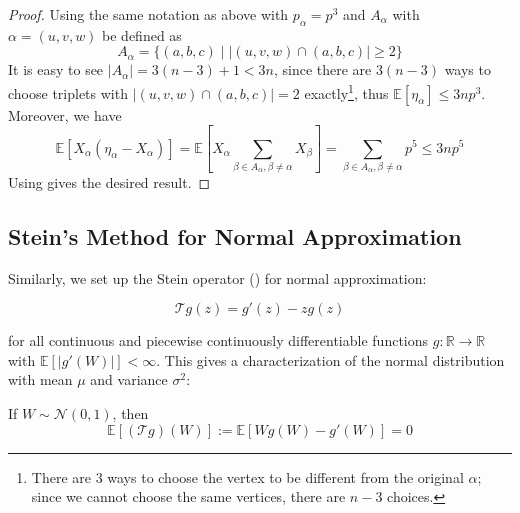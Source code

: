 \documentclass{article}
\begin{document}
\begin{proof}
    Using the same notation as above with $p_\alpha=p^3$ and $A_\alpha$ with $\alpha=(u,v,w)$ be defined as 
    \begin{equation*}
        A_{\alpha} = \{(a,b,c) \mid |(u,v,w)\cap (a,b,c)|\geq 2\}
    \end{equation*}
    It is easy to see $|A_\alpha| = 3(n-3) + 1 < 3n$, since there are  $3(n-3)$ ways to choose triplets with  $|(u,v,w)\cap (a,b,c)| = 2$ exactly\footnote{There are 3 ways to choose the vertex to be different from the original $\alpha$; since we cannot choose the same vertices, there are $n-3$ choices.}, thus $\mathbb{E}[\eta_\alpha]\leq 3np^3$. Moreover, we have  
    \begin{equation*}
        \mathbb{E}[X_\alpha(\eta_\alpha - X_\alpha)] = \mathbb{E}[X_\alpha \sum_{\beta \in A_\alpha, \beta \neq \alpha} X_\beta] = \sum_{\beta \in A_\alpha, \beta \neq \alpha} p^5 \leq 3np^5
    \end{equation*}
    Using  gives the desired result.
\end{proof}


\subsection{Stein's Method for Normal Approximation}
Similarly, we set up the Stein operator () for normal approximation:  

\begin{equation}\label{eq:stein_operator_normal}
    \mathcal{T}g(z) = g'(z) - zg(z)
\end{equation}

for all continuous and piecewise continuously differentiable functions $g: \mathbb{R} \to \mathbb{R}$ with $\mathbb{E}[|g'(W)|]<\infty$. This gives a characterization of the normal distribution with mean $\mu$ and variance $\sigma^2$:  

\begin{theorem}\label{thm:stein_operator_normal}
    If $W\sim \mathcal{N}(0, 1)$, then 
    \begin{equation*}
        \mathbb{E}[(\mathcal{T}g)(W)]:=\mathbb{E}[Wg(W) - g'(W)] = 0
    \end{equation*}
\end{theorem}
\end{document}
